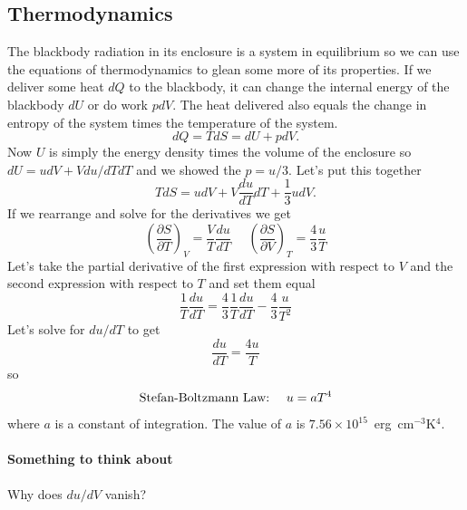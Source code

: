 \subsection{Thermodynamics}
\label{sec:thermodynamics}

The blackbody radiation in its enclosure is a system in equilibrium 
so we can use the equations of thermodynamics to glean some more of
its properties.  If we deliver some heat $dQ$ to the blackbody, it 
can change the internal energy of the blackbody $dU$ or do work $p
dV$.  The heat delivered also equals the change in entropy of the system
times the temperature of the system.
\begin{equation}
d Q = T d S = d U + p d V.
\label{eq:21}
\end{equation}
Now $U$ is simply the energy density times the volume of the enclosure
so $d U = u d V + V du/dT dT$ and we showed the $p=u/3$.   Let's put
this together
\begin{equation}
T d S = u d V + V \frac{d u}{d T} d T + \frac{1}{3} u d V.
\label{eq:22}
\end{equation}
If we rearrange and solve for the derivatives we get
\begin{equation}
\left ( \frac{\partial S}{\partial T} \right )_V = \frac{V}{T} \frac{d
u}{d T} ~~~~~~
\left ( \frac{\partial S}{\partial V} \right )_T = \frac{4}{3} \frac{u}{T}
\label{eq:23}
\end{equation}
Let's take the partial derivative of the first expression with respect
to $V$ and the second expression with respect to $T$ and set them
equal
\begin{equation}
\frac{1}{T} \frac{d u}{d T}  = \frac{4}{3} \frac{1}{T} \frac{d u}{d T}
- \frac{4}{3} \frac{u}{T^2}
\label{eq:24}
\end{equation}
Let's solve for $du/dT$ to get
\begin{equation}
\frac{d u}{d T} = \frac{4 u}{T}
\label{eq:25}
\end{equation}
so 
\begin{equation}
\hbox{\rm Stefan-Boltzmann Law:}~~~~u = a T^4
\label{eq:790}
\end{equation}
where $a$ is a constant of integration.  The value of $a$ is 
$7.56 \times 10^{15}$~erg~cm$^{-3}$K$^4$.

\paragraph{Something to think about} Why does $du/dV$ vanish?

